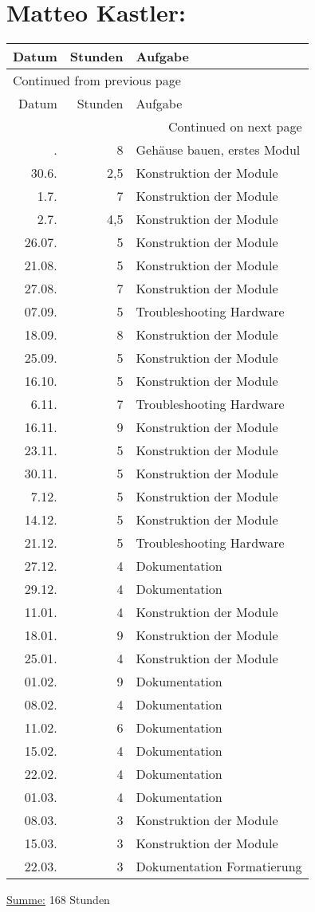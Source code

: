 \section*{Matteo Kastler:}
\label{sec:orga032dba}
\begin{longtable}{rrl}
\hline
Datum & Stunden & Aufgabe\\
\hline
\endfirsthead
\multicolumn{3}{l}{Continued from previous page} \\
\hline

Datum & Stunden & Aufgabe \\

\hline
\endhead
\hline\multicolumn{3}{r}{Continued on next page} \\
\endfoot
\endlastfoot
\hline
26.6. & 8 & Gehäuse bauen, erstes Modul\\
30.6. & 2,5 & Konstruktion der Module\\
1.7. & 7 & Konstruktion der Module\\
2.7. & 4,5 & Konstruktion der Module\\
26.07. & 5 & Konstruktion der Module\\
21.08. & 5 & Konstruktion der Module\\
27.08. & 7 & Konstruktion der Module\\
07.09. & 5 & Troubleshooting Hardware\\
18.09. & 8 & Konstruktion der Module\\
25.09. & 5 & Konstruktion der Module\\
16.10. & 5 & Konstruktion der Module\\
6.11. & 7 & Troubleshooting Hardware\\
16.11. & 9 & Konstruktion der Module\\
23.11. & 5 & Konstruktion der Module\\
30.11. & 5 & Konstruktion der Module\\
7.12. & 5 & Konstruktion der Module\\
14.12. & 5 & Konstruktion der Module\\
21.12. & 5 & Troubleshooting Hardware\\
27.12. & 4 & Dokumentation\\
29.12. & 4 & Dokumentation\\
11.01. & 4 & Konstruktion der Module\\
18.01. & 9 & Konstruktion der Module\\
25.01. & 4 & Konstruktion der Module\\
01.02. & 9 & Dokumentation\\
08.02. & 4 & Dokumentation\\
11.02. & 6 & Dokumentation\\
15.02. & 4 & Dokumentation\\
22.02. & 4 & Dokumentation\\
01.03. & 4 & Dokumentation\\
08.03. & 3 & Konstruktion der Module\\
15.03. & 3 & Konstruktion der Module\\
22.03. & 3 & Dokumentation Formatierung\\
\hline
\end{longtable}
\uline{Summe:} 168 Stunden
